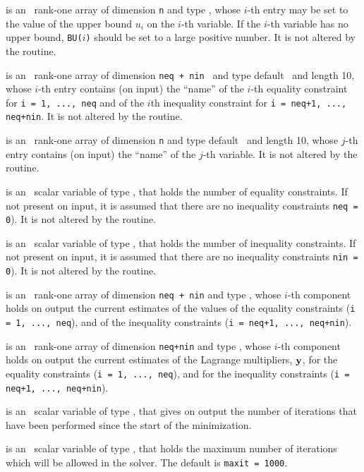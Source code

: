 \documentclass{galahad}
\begin{document}
\begin{description}
 is an \optional\ rank-one array of dimension {\tt n} and type
\realdp, whose $i$-th entry may be set
to the value of the upper bound $u_i$ on the $i$-th variable.
If the $i$-th variable has no upper bound, {\tt BU($i$)} should be set to
a large positive number.  It is not altered by the routine.

 is an \optional\  rank-one array of dimension {\tt neq + nin }
and type default \character\ and length 10, whose $i$-th entry contains (on
input) the ``name'' of the $i$-th equality constraint  for
{\tt i = 1, ..., neq} and of the $i$th inequality constraint for
{\tt i = neq+1, ..., neq+nin}.  It is not altered by the routine.

 is an \optional\ rank-one array of dimension {\tt n} and type
default \character\ and length 10, whose $j$-th entry contains (on input) the
``name'' of the $j$-th variable.  It is not altered by the routine.

 is an \optional\ scalar variable of type \integer, that holds
the number of equality constraints. If not present on input, it is assumed
that there are no inequality constraints {\tt neq = 0}). It is not altered by
the routine.

 is an \optional\ scalar variable of type \integer, that holds
the number of inequality constraints. If not present on input, it is assumed
that there are no inequality constraints {\tt nin = 0}). It is not altered by
the routine.

 is an \optional\ rank-one array of dimension {\tt neq + nin} and type
\realdp, whose $i$-th component holds on output the current
estimates of the values of the equality constraints ({\tt i = 1, ..., neq}),
and of the inequality constraints  ({\tt i = neq+1, ..., neq+nin}).

 is an \optional\ rank-one array of dimension {\tt neq+nin} and type
\realdp, whose $i$-th component holds on output the current
estimates of the Lagrange multipliers, ${\mathbf{y}}$, for the equality constraints
({\tt i = 1, ..., neq}), and for the inequality constraints  ({\tt i = neq+1,
  ..., neq+nin}).

 is an \optional\ scalar variable of type \integer, that gives
on output the number of iterations that have been performed since the start of
the  minimization.

 is an \optional\ scalar variable of type \integer, that
holds the maximum number of iterations which will be allowed in the solver.
The default is {\tt maxit = 1000}.


\end{description}
\end{document}
